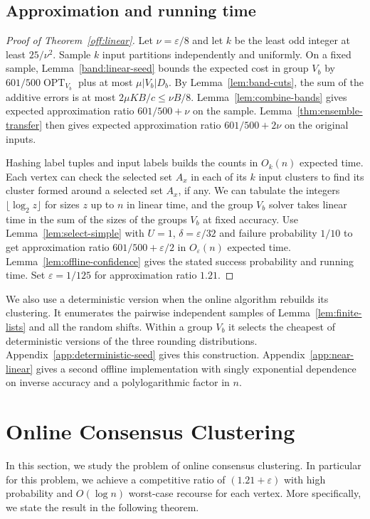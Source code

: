 \documentclass[11pt]{article}
\newcommand{\OPT}{\operatorname{OPT}}
\begin{document}
\subsection{Approximation and running time}

\begin{proof}[Proof of Theorem~\ref{off:linear}]
Let $\nu=\varepsilon/8$ and let $k$ be the least odd integer at least
$25/\nu^2$. Sample $k$ input partitions independently and uniformly. On a fixed sample, Lemma~\ref{band:linear-seed}
bounds the expected cost in group $V_b$ by $601/500\OPT_{V_b}$
plus at most $\mu|V_b|D_b$.
By Lemma~\ref{lem:band-cuts}, the sum of the additive errors is at
most $2\mu KB/c\le\nu B/8$. Lemma~\ref{lem:combine-bands} gives
expected approximation ratio $601/500+\nu$ on the sample. Lemma~\ref{thm:ensemble-transfer}
then gives expected approximation ratio $601/500+2\nu$ on the original
inputs.

Hashing label tuples and input labels builds the counts in
$O_k(n)$ expected time. Each vertex can check the selected set $A_x$ in each of its
$k$ input clusters to find its cluster formed around a selected set $A_x$, if any. We can
tabulate the integers $\lfloor\log_2 z\rfloor$ for sizes $z$ up to $n$ in linear time, and the group $V_b$
solver takes linear time in the sum of the sizes of the groups $V_b$ at fixed
accuracy. Use Lemma~\ref{lem:select-simple} with $U=1$,
$\delta=\varepsilon/32$ and failure probability $1/10$ to get
approximation ratio $601/500+\varepsilon/2$ in $O_\varepsilon(n)$
expected time. Lemma~\ref{lem:offline-confidence} gives the stated
success probability and running time. Set $\varepsilon=1/125$ for approximation ratio $1.21$.
\end{proof}

We also use a deterministic version when the online algorithm rebuilds
its clustering. It
enumerates the pairwise independent samples of
Lemma~\ref{lem:finite-lists} and all the random shifts. Within a group $V_b$
it selects the cheapest of deterministic versions of the three
rounding distributions. Appendix~\ref{app:deterministic-seed}
gives this construction. Appendix~\ref{app:near-linear} gives a
second offline implementation with singly exponential dependence
on inverse accuracy and a polylogarithmic factor in $n$.

\section{Online Consensus Clustering}
\label{joint:section}
In this section, we study the problem of online consensus clustering. In particular for this problem, we achieve a competitive ratio of $(1.21 + \varepsilon)$ with high probability and $O(\log n)$ worst-case recourse for each vertex. More specifically, we state the result in the following theorem.
\OnlineMain*
\end{document}
